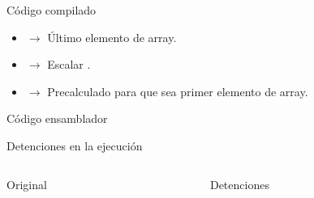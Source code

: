\begin{frame}[t]{Código compilado}
\begin{itemize}
  \item {} $\rightarrow$ Último elemento de array.
  \item {} $\rightarrow$ Escalar .
  \item {} $\rightarrow$ Precalculado para que  sea primer elemento de array.
\end{itemize}

\begin{block}{Código ensamblador}

\end{block}

\end{frame}

\begin{frame}[t]{Detenciones en la ejecución}

\begin{columns}[T]

\begin{column}{.45\textwidth}
\begin{block}{Original}

\end{block}
\end{column}

\pause
\begin{column}{.45\textwidth}
\begin{block}{Detenciones}

\end{block}
\end{column}

\end{columns}
\end{frame}

